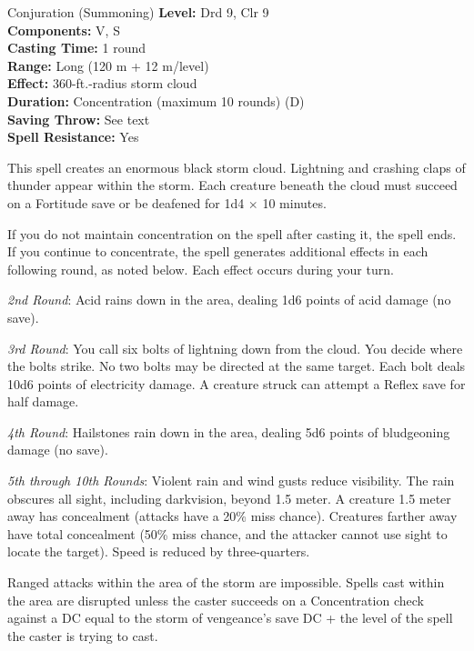 {Conjuration (Summoning)}
{
	\textbf{Level:}
	Drd 9, Clr 9\\
	\textbf{Components:}
	V, S\\
	\textbf{Casting Time:}
	1 round\\
	\textbf{Range:}
	Long (120 m + 12 m/level)\\
	\textbf{Effect:}
	360-ft.-radius storm cloud\\
	\textbf{Duration:}
	Concentration (maximum 10 rounds) (D)\\
	\textbf{Saving Throw:}
	See text\\
	\textbf{Spell Resistance:}
	Yes\\
}
{
	This spell creates an enormous black storm cloud. Lightning and crashing claps of thunder appear within the storm. Each creature beneath the cloud must succeed on a Fortitude save or be deafened for 1d4 $\times$ 10 minutes.

	If you do not maintain concentration on the spell after casting it, the spell ends.  If you continue to concentrate, the spell generates additional effects in each following round, as noted below. Each effect occurs during your turn.

	\textit{2nd Round}:
	Acid rains down in the area, dealing 1d6 points of acid damage (no save).

	\textit{3rd Round}:
	You call six bolts of lightning down from the cloud. You decide where the bolts strike. No two bolts may be directed at the same target. Each bolt deals 10d6 points of electricity damage. A creature struck can attempt a Reflex save for half damage.

	\textit{4th Round}:
	Hailstones rain down in the area, dealing 5d6 points of bludgeoning damage (no save).

	\textit{5th through 10th Rounds}:
	Violent rain and wind gusts reduce visibility. The rain obscures all sight, including darkvision, beyond 1.5 meter. A creature 1.5 meter away has concealment (attacks have a 20\% miss chance). Creatures farther away have total concealment (50\% miss chance, and the attacker cannot use sight to locate the target). Speed is reduced by three-quarters.

	Ranged attacks within the area of the storm are impossible. Spells cast within the area are disrupted unless the caster succeeds on a Concentration check against a DC equal to the storm of vengeance's save DC + the level of the spell the caster is trying to cast.

}
